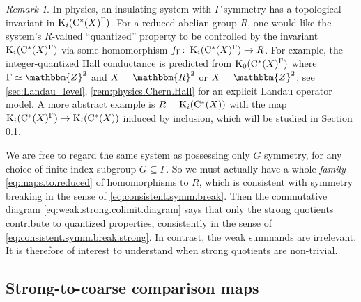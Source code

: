 \documentclass{amsart}
\numberwithin{figure}{section}
\numberwithin{equation}{section}
\numberwithin{table}{section}
\theoremstyle{plain}
\theoremstyle{definition}
\theoremstyle{remark}
\newtheorem{remark}[equation]{Remark}
\theoremstyle{nonumber}
\newcommand{\Z}{\mathbb{Z}}
\newcommand{\R}{\mathbb{R}}
\newcommand{\K}{\relax\ifmmode\operatorname{K}\else\textup{K}\fi}
\newcommand{\Cst}{\relax\ifmmode\mathrm{C}^*\else\textup{C*}\fi}
\renewcommand{\mathbb}{\mathbbm} %
\begin{document}
\begin{remark}
In physics, an insulating
system with $\Gamma$-symmetry has a topological invariant in
$\K_i(\Cst(X)^\Gamma)$. For a reduced abelian group $R$, one would like the
system's $R$-valued ``quantized'' property to be
controlled by the invariant $\K_i(\Cst(X)^\Gamma)$ via some homomorphism
$f_\Gamma\colon \K_i(\Cst(X)^\Gamma)\to R$. For example, the
integer-quantized Hall conductance is predicted from
$\K_0(\Cst(X)^{\Gamma})$ where \( \Gamma\simeq\Z^2
\) and \( X=\R^2 \) or \( X=\Z^2 \); 
see \cref{sec:Landau_level}, \cref{rem:physics.Chern.Hall} for an explicit
Landau operator model. A more abstract example is $R=\K_i(\Cst(X))$ with the map $\K_i(\Cst(X)^\Gamma)\to \K_i(\Cst(X))$ induced by inclusion, which will be studied in Section \ref{sec:comparison.with.non.equivariant}.


We are free to regard
the same system as possessing only $G$ symmetry, for any choice of
finite-index subgroup $G\subseteq \Gamma$. So we must actually have a whole
\emph{family} \eqref{eq:maps.to.reduced} of homomorphisms to $R$, which is
consistent with symmetry breaking in the sense of
\eqref{eq:consistent.symm.break}. Then the commutative diagram
\eqref{eq:weak.strong.colimit.diagram} says that only the strong quotients
contribute to quantized properties, consistently in the sense of \eqref{eq:consistent.symm.break.strong}. In contrast, the weak summands are
irrelevant. It is therefore of interest to understand when strong quotients are non-trivial.
\end{remark}


\subsection{Strong-to-coarse comparison maps}
\label{sec:comparison.with.non.equivariant}
\end{document}
